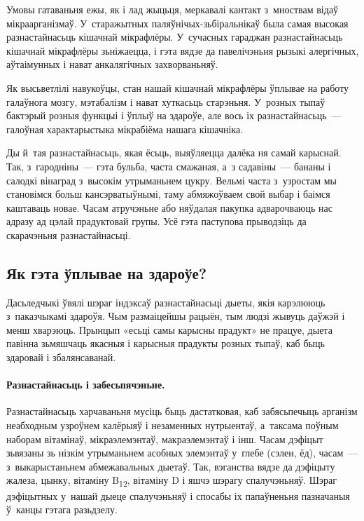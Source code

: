 Умовы гатаваньня ежы, як і лад жыцьця, меркавалі кантакт з~мноствам відаў мікраарганізмаў. У~старажытных паляўнічых-зьбіральнікаў была самая высокая разнастайнасьць кішачнай мікрафлёры. У~сучасных гараджан разнастайнасьць кішачнай мікрафлёры зьніжаецца, і гэта вядзе да павелічэньня рызыкі алергічных, аўтаімунных і нават анкалягічных захворваньняў.


Як высьветлілі навукоўцы, стан нашай кішачнай мікрафлёры ўплывае на работу галаўнога мозгу, мэтабалізм і нават хуткасьць старэньня. У~розных тыпаў бактэрый розныя функцыі і ўплыў на здароўе, але вось іх разнастайнасьць~--- галоўная характарыстыка мікрабіёма нашага кішачніка.

Ды й~тая разнастайнасьць, якая ёсьць, выяўляецца далёка ня самай карыснай. Так, з~гародніны~--- гэта бульба, часта смажаная, а~з садавіны~--- бананы і салодкі вінаград з~высокім утрыманьнем цукру. Вельмі часта з~узростам мы становімся больш кансэрватыўнымі, таму абмяжоўваем свой выбар і баімся каштаваць новае. Часам атручэньне або няўдалая пакупка адварочваюць нас адразу ад цэлай прадуктовай групы. Усё гэта паступова прыводзіць да скарачэньня разнастайнасьці.

\subsection{Як гэта ўплывае на здароўе?}

Дасьледчыкі ўвялі шэраг індэксаў разнастайнасьці дыеты, якія карэлююць з~паказчыкамі здароўя. Чым размаіцейшы рацыён, тым людзі жывуць даўжэй і менш хварэюць. Прынцып «есьці самы карысны прадукт» не працуе, дыета павінна зьмяшчаць якасныя і карысныя прадукты розных тыпаў, каб быць здаровай і збалянсаванай.

\paragraph{Разнастайнасьць і забесьпячэньне.}
Разнастайнасьць харчаваньня мусіць быць дастатковая, каб забясьпечыць арганізм неабходным узроўнем калёрыяў і незаменных нутрыентаў, а~таксама поўным наборам вітамінаў, мікраэлемэнтаў, макраэлемэнтаў і інш. Часам дэфіцыт зьвязаны зь нізкім утрыманьнем асобных элемэнтаў у~глебе (сэлен, ёд), часам~--- з~выкарыстаньнем абмежавальных дыетаў. Так, вэганства вядзе да дэфіцыту жалеза, цынку, вітаміну B\textsubscript{12}, вітаміну D і яшчэ шэрагу спалучэньняў. Шэраг дэфіцытных у~нашай дыеце спалучэньняў і спосабы іх папаўненьня пазначаныя ў~канцы гэтага разьдзелу.

